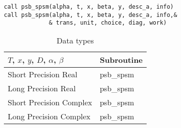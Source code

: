 \begin{verbatim}
call psb_spsm(alpha, t, x, beta, y, desc_a, info)
call psb_spsm(alpha, t, x, beta, y, desc_a, info,&
             & trans, unit, choice, diag, work)
\end{verbatim} 

\begin{table}[h]
\begin{center}
\begin{tabular}{ll}
\hline
$T$, $x$, $y$, $D$, $\alpha$, $\beta$ & {\bf Subroutine}\\
\hline
Short Precision Real & psb\_spsm \\
Long Precision Real & psb\_spsm \\
Short Precision Complex & psb\_spsm \\
Long Precision Complex & psb\_spsm \\
\hline
\end{tabular}
\end{center}
\caption{Data types\label{tab:f90spsm}}
\end{table}



